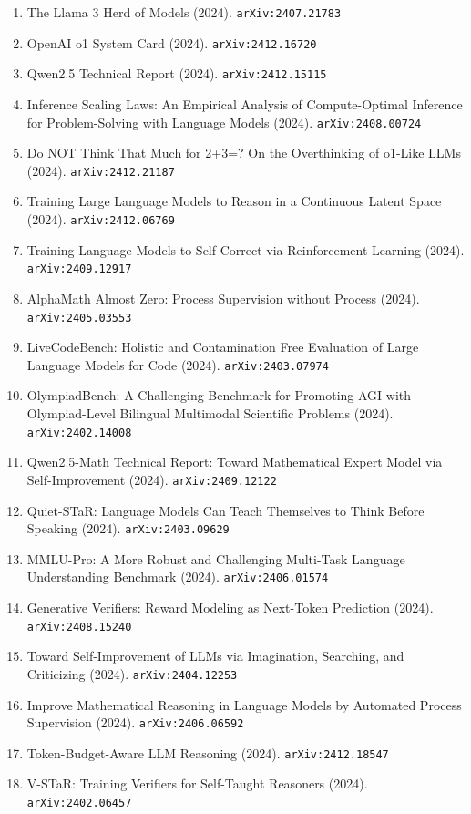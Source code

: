 \documentclass[11pt]{article}
\begin{document}
\begin{enumerate}
  \item The Llama 3 Herd of Models (2024). \texttt{arXiv:2407.21783}
  \item OpenAI o1 System Card (2024). \texttt{arXiv:2412.16720}
  \item Qwen2.5 Technical Report (2024). \texttt{arXiv:2412.15115}
  \item Inference Scaling Laws: An Empirical Analysis of Compute-Optimal
  Inference for Problem-Solving with Language Models (2024). \texttt{arXiv:2408.00724}
  \item Do NOT Think That Much for 2+3=? On the Overthinking of o1-Like LLMs (2024). \texttt{arXiv:2412.21187}
  \item Training Large Language Models to Reason in a Continuous Latent Space (2024). \texttt{arXiv:2412.06769}
  \item Training Language Models to Self-Correct via Reinforcement Learning (2024). \texttt{arXiv:2409.12917}
  \item AlphaMath Almost Zero: Process Supervision without Process (2024). \texttt{arXiv:2405.03553}
  \item LiveCodeBench: Holistic and Contamination Free Evaluation of Large
  Language Models for Code (2024). \texttt{arXiv:2403.07974}
  \item OlympiadBench: A Challenging Benchmark for Promoting AGI with
  Olympiad-Level Bilingual Multimodal Scientific Problems (2024). \texttt{arXiv:2402.14008}
  \item Qwen2.5-Math Technical Report: Toward Mathematical Expert Model via
  Self-Improvement (2024). \texttt{arXiv:2409.12122}
  \item Quiet-STaR: Language Models Can Teach Themselves to Think Before
  Speaking (2024). \texttt{arXiv:2403.09629}
  \item MMLU-Pro: A More Robust and Challenging Multi-Task Language
  Understanding Benchmark (2024). \texttt{arXiv:2406.01574}
  \item Generative Verifiers: Reward Modeling as Next-Token Prediction (2024). \texttt{arXiv:2408.15240}
  \item Toward Self-Improvement of LLMs via Imagination, Searching, and
  Criticizing (2024). \texttt{arXiv:2404.12253}
  \item Improve Mathematical Reasoning in Language Models by Automated Process
  Supervision (2024). \texttt{arXiv:2406.06592}
  \item Token-Budget-Aware LLM Reasoning (2024). \texttt{arXiv:2412.18547}
  \item V-STaR: Training Verifiers for Self-Taught Reasoners (2024). \texttt{arXiv:2402.06457}

\end{enumerate}
\end{document}
